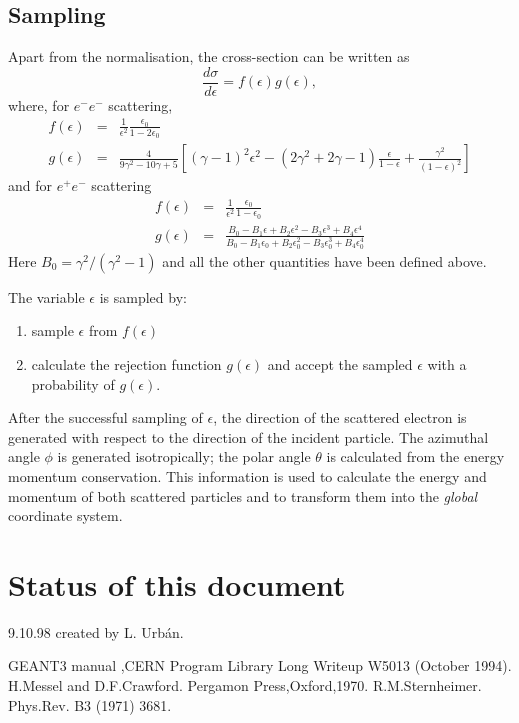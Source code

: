 \subsection{Sampling}

Apart from the normalisation, the cross-section can be written as
\[
\frac{d\sigma}{d\epsilon}=f(\epsilon) g(\epsilon),
\]
where, for $e^- e^-$ scattering,
\begin{eqnarray*}
f(\epsilon)&=&\frac{1}{\epsilon^2} \frac{\epsilon_0 }{1- 2\epsilon_0} \\
g(\epsilon)&=&\frac{4}{9\gamma^2 - 10 \gamma + 5}\left[(\gamma -1)^2
\epsilon^2 - (2 \gamma^2 +2\gamma -1) \frac{\epsilon} {1- \epsilon }+
\frac{\gamma^2}{(1- \epsilon )^2 }\right]
\end{eqnarray*}
and for $e^+ e^-$ scattering
\begin{eqnarray*}
  f(\epsilon)&=&\frac{1}{\epsilon^2} \frac{\epsilon_0}{1- \epsilon_0 } \\
  g(\epsilon)&=&\frac{B_0 -B_1 \epsilon +B_2 \epsilon^2
     -B_3 \epsilon^3 +B_4 \epsilon ^4}{B_ 0-B_1\epsilon_0
+B_2\epsilon^2_0
    -B_3 \epsilon^3_0 +B_4 \epsilon^4_0 }
\end{eqnarray*}
Here $ B_0=\gamma^2/(\gamma^2-1)$ and
all the other quantities have been defined above.

The variable $\epsilon$ is sampled by:
\begin{enumerate}
\item sample $\epsilon$ from $f(\epsilon)$
\item calculate the rejection function $g(\epsilon)$ and accept the
sampled $\epsilon$ with a probability of $g(\epsilon)$.
\end{enumerate}

After the successful sampling of $\epsilon$,  the direction
 of the scattered electron is generated with respect to the direction of the
incident particle. The azimuthal angle $\phi$ is generated isotropically;
the polar angle
$\theta$ is calculated from the energy momentum conservation.
This information
is used to calculate the energy and momentum of both scattered
particles and to transform them into the {\em global} coordinate system.

\section{Status of this document}

 9.10.98     created by L. Urb\'an.

\begin{thebibliography}{99}

  GEANT3 manual ,CERN Program Library Long Writeup W5013 (October 1994).
  H.Messel and D.F.Crawford. Pergamon Press,Oxford,1970.
  R.M.Sternheimer. Phys.Rev. B3 (1971) 3681.

\end{thebibliography}

